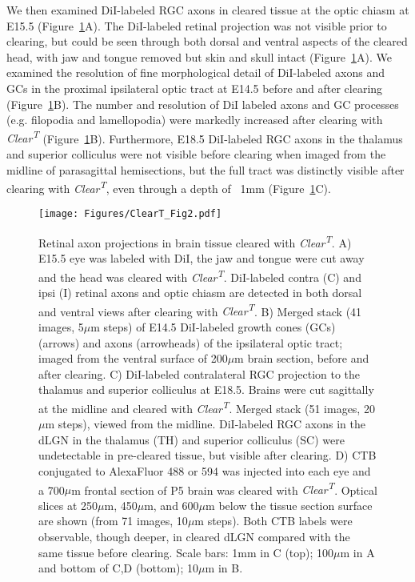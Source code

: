 We then examined DiI-labeled RGC axons in cleared tissue at the optic chiasm at E15.5 (Figure~\ref{ClearTFig2}A).
The DiI-labeled retinal projection was not visible prior to clearing, but could be seen through both dorsal and ventral aspects of the cleared head, with jaw and tongue removed but skin and skull intact (Figure~\ref{ClearTFig2}A).
We examined the resolution of fine morphological detail of DiI-labeled axons and GCs in the proximal ipsilateral optic tract at E14.5 before and after clearing (Figure~\ref{ClearTFig2}B).
The number and resolution of DiI labeled axons and GC processes (e.g. filopodia and lamellopodia) were markedly increased after clearing with \emph{Clear\textsuperscript{T}} (Figure~\ref{ClearTFig2}B).
Furthermore, E18.5 DiI-labeled RGC axons in the thalamus and superior colliculus were not visible before clearing when imaged from the midline of parasagittal hemisections, but the full tract was distinctly visible after clearing with \emph{Clear\textsuperscript{T}}, even through a depth of ~1mm (Figure~\ref{ClearTFig2}C).
\begin{figure}[hbtp]
    \begin{center}
        \texttt{[image: Figures/ClearT\_Fig2.pdf]}
        \caption[Retinal axon projections in brain tissue cleared with \emph{Clear\textsuperscript{T}}.]
        {Retinal axon projections in brain tissue cleared with \emph{Clear\textsuperscript{T}}.
        A) E15.5 eye was labeled with DiI, the jaw and tongue were cut away and the head was cleared with \emph{Clear\textsuperscript{T}}.
        DiI-labeled contra (C) and ipsi (I) retinal axons and optic chiasm are detected in both dorsal and ventral views after clearing with \emph{Clear\textsuperscript{T}}.
        B) Merged stack (41 images, 5$\mu$m steps) of E14.5 DiI-labeled growth cones (GCs) (arrows) and axons (arrowheads) of the ipsilateral optic tract; imaged from the ventral surface of 200$\mu$m brain section, before and after clearing.
        C) DiI-labeled contralateral RGC projection to the thalamus and superior colliculus at E18.5.
        Brains were cut sagittally at the midline and cleared with \emph{Clear\textsuperscript{T}}.
        Merged stack (51 images, 20$\mu$m steps), viewed from the midline.
        DiI-labeled RGC axons in the dLGN in the thalamus (TH) and superior colliculus (SC) were undetectable in pre-cleared tissue, but visible after clearing.
        D) CTB conjugated to AlexaFluor 488 or 594 was injected into each eye and a 700$\mu$m frontal section of P5 brain was cleared with \emph{Clear\textsuperscript{T}}.
        Optical slices at 250$\mu$m, 450$\mu$m, and 600$\mu$m below the tissue section surface are shown (from 71 images, 10$\mu$m steps).
        Both CTB labels were observable, though deeper, in cleared dLGN compared with the same tissue before clearing.
        Scale bars: 1mm in C (top); 100$\mu$m in A and bottom of C,D (bottom); 10$\mu$m in B.
        }
        \label{ClearTFig2}
    \end{center}
\end{figure}

